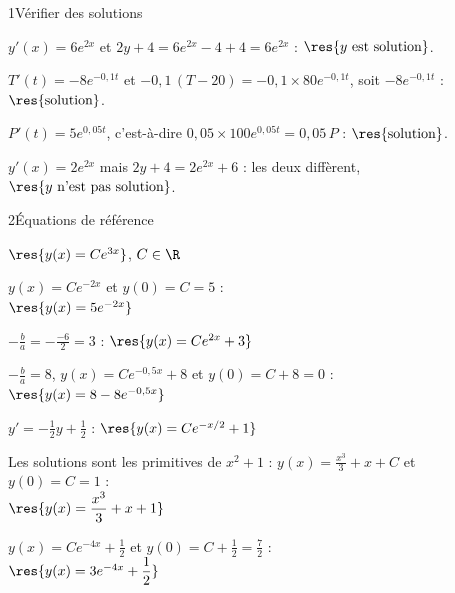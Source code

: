 

\begin{deuxcolonnes}

\begin{corrige}{1}{Vérifier des solutions}
\begin{questions}
  \item $y'(x)=6e^{2x}$ et $2y+4=6e^{2x}-4+4=6e^{2x}$ : $\res{y\text{ est solution}}$.
  \item $T'(t)=-8e^{-0{,}1t}$ et $-0{,}1\,(T-20)=-0{,}1\times80e^{-0{,}1t}$, soit $-8e^{-0{,}1t}$ : $\res{\text{solution}}$.
  \item $P'(t)=5e^{0{,}05t}$, c'est-à-dire $0{,}05\times100e^{0{,}05t}=0{,}05\,P$ : $\res{\text{solution}}$.
  \item $y'(x)=2e^{2x}$ mais $2y+4=2e^{2x}+6$ : les deux diffèrent, $\res{y\text{ n'est pas solution}}$.
\end{questions}
\end{corrige}

\begin{corrige}{2}{Équations de référence}
\begin{questions}
  \item $\res{y(x)=Ce^{3x}}$, $C\in\R$
  \item $y(x)=Ce^{-2x}$ et $y(0)=C=5$ :\\ $\res{y(x)=5e^{-2x}}$
  \item $-\frac ba=-\frac{-6}{2}=3$ : $\res{y(x)=Ce^{2x}+3}$
  \item $-\frac ba=8$, $y(x)=Ce^{-0{,}5x}+8$ et $y(0)=C+8=0$ :\\ $\res{y(x)=8-8e^{-0{,}5x}}$
  \item $y'=-\frac12y+\frac12$ : $\res{y(x)=Ce^{-x/2}+1}$
  \item Les solutions sont les primitives de $x^{2}+1$ : $y(x)=\frac{x^{3}}{3}+x+C$ et $y(0)=C=1$ :\\
    $\res{y(x)=\dfrac{x^{3}}{3}+x+1}$
  \item $y(x)=Ce^{-4x}+\frac12$ et $y(0)=C+\frac12=\frac72$ :\\ $\res{y(x)=3e^{-4x}+\dfrac12}$
\end{questions}
\end{corrige}


\end{deuxcolonnes}
